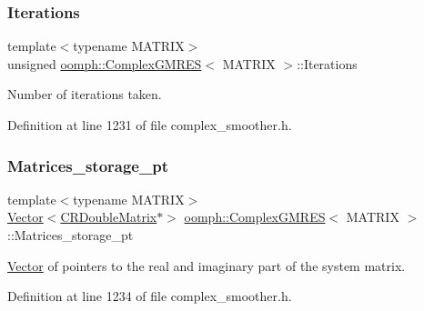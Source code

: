 \subsubsection{\texorpdfstring{Iterations}{Iterations}}
{\footnotesize\ttfamily template$<$typename M\+A\+T\+R\+IX$>$ \\
unsigned \hyperlink{classoomph_1_1ComplexGMRES}{oomph\+::\+Complex\+G\+M\+R\+ES}$<$ M\+A\+T\+R\+IX $>$\+::Iterations\hspace{0.3cm}{\ttfamily [private]}}



Number of iterations taken. 



Definition at line 1231 of file complex\+\_\+smoother.\+h.

\mbox{\label{classoomph_1_1ComplexGMRES_adfd862b611a335b5d6872a9eb37aa193}} 
\subsubsection{\texorpdfstring{Matrices\+\_\+storage\+\_\+pt}{Matrices\_storage\_pt}}
{\footnotesize\ttfamily template$<$typename M\+A\+T\+R\+IX$>$ \\
\hyperlink{classoomph_1_1Vector}{Vector}$<$\hyperlink{classoomph_1_1CRDoubleMatrix}{C\+R\+Double\+Matrix}$\ast$$>$ \hyperlink{classoomph_1_1ComplexGMRES}{oomph\+::\+Complex\+G\+M\+R\+ES}$<$ M\+A\+T\+R\+IX $>$\+::Matrices\+\_\+storage\+\_\+pt\hspace{0.3cm}{\ttfamily [private]}}



\hyperlink{classoomph_1_1Vector}{Vector} of pointers to the real and imaginary part of the system matrix. 



Definition at line 1234 of file complex\+\_\+smoother.\+h.

\mbox{\label{classoomph_1_1ComplexGMRES_aa38fa18230fc30f271d59481ccee3b55}} 
